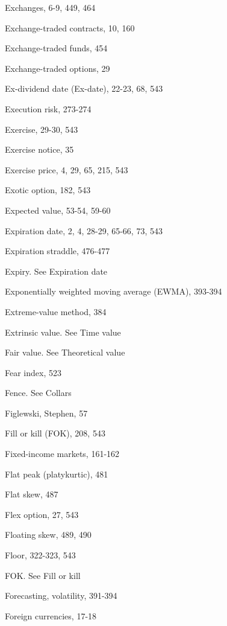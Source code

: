 \noindent Exchanges, 6-9, 449, 464\par
\noindent Exchange-traded contracts, 10, 160\par
\noindent Exchange-traded funds, 454\par
\noindent Exchange-traded options, 29\par
\noindent Ex-dividend date (Ex-date), 22-23, 68, 543\par
\noindent Execution risk, 273-274\par
\noindent Exercise, 29-30, 543\par
\noindent Exercise notice, 35\par
\noindent Exercise price, 4, 29, 65, 215, 543\par
\noindent Exotic option, 182, 543\par
\noindent Expected value, 53-54, 59-60\par
\noindent Expiration date, 2, 4, 28-29, 65-66, 73, 543\par
\noindent Expiration straddle, 476-477\par
\noindent Expiry. See Expiration date\par
\noindent Exponentially weighted moving average (EWMA), 393-394\par
\noindent Extreme-value method, 384\par
\noindent Extrinsic value. See Time value\par
\noindent Fair value. See Theoretical value\par
\noindent Fear index, 523\par
\noindent Fence. See Collars\par
\noindent Figlewski, Stephen, 57\par
\noindent Fill or kill (FOK), 208, 543\par
\noindent Fixed-income markets, 161-162\par
\noindent Flat peak (platykurtic), 481\par
\noindent Flat skew, 487\par
\noindent Flex option, 27, 543\par
\noindent Floating skew, 489, 490\par
\noindent Floor, 322-323, 543\par
\noindent FOK. See Fill or kill\par
\noindent Forecasting, volatility, 391-394\par
\noindent Foreign currencies, 17-18\par

